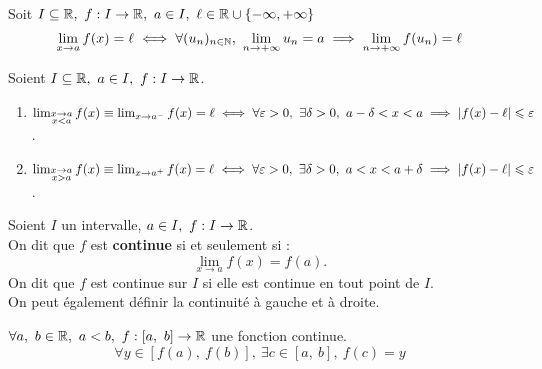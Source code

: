\begin{theorem}
	Soit $I \subseteq \mathbb{R},\ f : I \to \mathbb{R},\ a \in I,\ \ell \in \mathbb{R} \cup \{-\infty, +\infty\}$
	\[ \lim_{x \to a} f(x) = \ell \iff \forall (u_n)_{n \in \mathbb{N}},\ \lim_{n \to +\infty} u_n = a \implies \lim_{n \to +\infty} f(u_n) = \ell \]
\end{theorem}

\begin{definition}
    Soient $I \subseteq \mathbb{R},\ a \in I,\ f : I \to \mathbb{R} $.
    \begin{enumerate}
        \item $ \lim_{\substack{x \to a \\ x < a}} f(x) \equiv \lim_{x \to a^-} f(x) = \ell \iff \forall \varepsilon > 0,\ \exists \delta > 0,\ a - \delta < x < a \implies \abs{f(x) - \ell} \leqslant \varepsilon $.
        \item $\lim_{\substack{x \to a \\ x > a}} f(x) \equiv \lim_{x \to a^+} f(x) = \ell \iff \forall \varepsilon > 0,\ \exists \delta > 0,\ a < x < a + \delta \implies \abs{f(x) - \ell} \leqslant \varepsilon$.
    \end{enumerate}
\end{definition}

\begin{definition}[Continuité]
	Soient $I$ un intervalle, $a \in I,\ f : I \to \mathbb{R}$.
        \\ 
        On dit que $f$ est \textbf{continue} si et seulement si :
        \[\lim_{x \to a} f(x) = f(a).\] 
	On dit que $f$ est continue sur $I$ si elle est continue en tout point de $I$.\\
	On peut également définir la continuité à gauche et à droite.
\end{definition}

\begin{theorem}
	$\forall a,\ b \in \R,\ a < b,\ f : [a,\ b] \to \R$ une fonction continue.
	\[ \forall y \in [f(a),\ f(b)],\ \exists c \in [a,\ b],\ f(c) = y \]
\end{theorem}

